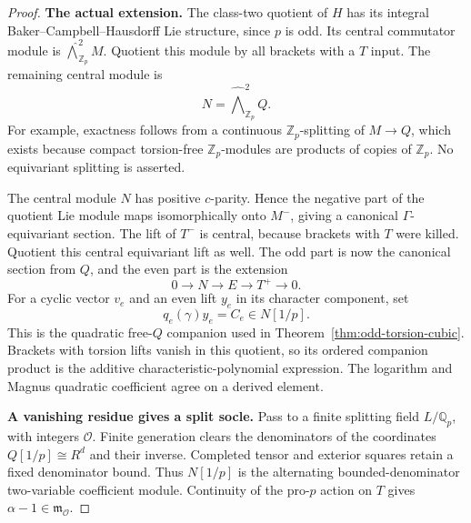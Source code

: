 \documentclass[11pt,a4paper]{article}
\theoremstyle{definition}
\begin{document}
\begin{proof}
\par\medskip\noindent\textbf{The actual extension.}
The class-two quotient of \(H\) has its integral
Baker--Campbell--Hausdorff Lie structure, since \(p\) is odd.
Its central commutator module is
\(\widehat{\bigwedge}^2_{\mathbb Z_p}M\).
Quotient this module by all brackets with a \(T\) input.
The remaining central module is
\[
                      N=\widehat{\bigwedge}^2_{\mathbb Z_p}Q.
\]
For example, exactness follows from a continuous
\(\mathbb Z_p\)-splitting of \(M\to Q\), which exists because
compact torsion-free \(\mathbb Z_p\)-modules are products of
copies of \(\mathbb Z_p\).  No equivariant splitting is asserted.

The central module \(N\) has positive \(c\)-parity.  Hence the
negative part of the quotient Lie module maps isomorphically
onto \(M^-\), giving a canonical \(\Gamma\)-equivariant section.
The lift of \(T^-\) is central, because brackets with \(T\)
were killed.  Quotient this central equivariant lift as well.
The odd part is now the canonical section from \(Q\), and the
even part is the extension
\[
          0\longrightarrow N\longrightarrow E
                 \longrightarrow T^+\longrightarrow0.     \tag{NC.8}
\]
For a cyclic vector \(v_e\) and an even lift \(y_e\) in its
character component, set
\[
                    q_e(\gamma)y_e=C_e\in N[1/p].           \tag{NC.9}
\]
This is the quadratic free-\(Q\) companion used in
Theorem~\ref{thm:odd-torsion-cubic}.  Brackets with torsion
lifts vanish in this quotient, so its ordered companion product
is the additive characteristic-polynomial expression.
The logarithm and Magnus quadratic coefficient agree on a
derived element.

\par\medskip\noindent\textbf{A vanishing residue gives a split socle.}
Pass to a finite splitting field \(L/\mathbb Q_p\), with integers
\(\mathcal O\).  Finite generation clears the denominators of the
coordinates \(Q[1/p]\cong R^d\) and their inverse.  Completed
tensor and exterior squares retain a fixed denominator bound.
Thus \(N[1/p]\) is the alternating bounded-denominator
two-variable coefficient module.  Continuity of the pro-\(p\)
action on \(T\) gives \(\alpha-1\in\mathfrak m_{\mathcal O}\).


\end{proof}
\end{document}
